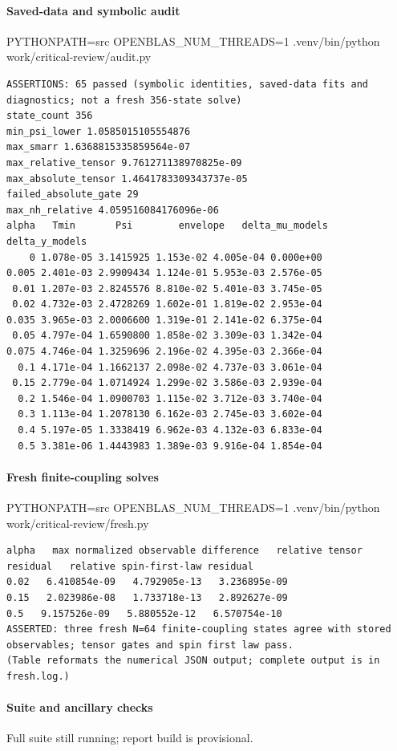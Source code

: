 \documentclass[10pt,a4paper]{article}
\begin{document}
\paragraph{Saved-data and symbolic audit} PYTHONPATH=src OPENBLAS\_NUM\_THREADS=1 .venv/bin/python work/critical-review/audit.py
\begin{Verbatim}[fontsize=\scriptsize]
ASSERTIONS: 65 passed (symbolic identities, saved-data fits and diagnostics; not a fresh 356-state solve)
state_count 356
min_psi_lower 1.0585015105554876
max_smarr 1.6368815335859564e-07
max_relative_tensor 9.761271138970825e-09
max_absolute_tensor 1.4641783309343737e-05
failed_absolute_gate 29
max_nh_relative 4.059516084176096e-06
alpha   Tmin       Psi        envelope   delta_mu_models delta_y_models
    0 1.078e-05 3.1415925 1.153e-02 4.005e-04 0.000e+00
0.005 2.401e-03 2.9909434 1.124e-01 5.953e-03 2.576e-05
 0.01 1.207e-03 2.8245576 8.810e-02 5.401e-03 3.745e-05
 0.02 4.732e-03 2.4728269 1.602e-01 1.819e-02 2.953e-04
0.035 3.965e-03 2.0006600 1.319e-01 2.141e-02 6.375e-04
 0.05 4.797e-04 1.6590800 1.858e-02 3.309e-03 1.342e-04
0.075 4.746e-04 1.3259696 2.196e-02 4.395e-03 2.366e-04
  0.1 4.171e-04 1.1662137 2.098e-02 4.737e-03 3.061e-04
 0.15 2.779e-04 1.0714924 1.299e-02 3.586e-03 2.939e-04
  0.2 1.546e-04 1.0900703 1.115e-02 3.712e-03 3.740e-04
  0.3 1.113e-04 1.2078130 6.162e-03 2.745e-03 3.602e-04
  0.4 5.197e-05 1.3338419 6.962e-03 4.132e-03 6.833e-04
  0.5 3.381e-06 1.4443983 1.389e-03 9.916e-04 1.854e-04

\end{Verbatim}
\paragraph{Fresh finite-coupling solves} PYTHONPATH=src OPENBLAS\_NUM\_THREADS=1 .venv/bin/python work/critical-review/fresh.py
\begin{Verbatim}[fontsize=\scriptsize]
alpha   max normalized observable difference   relative tensor residual   relative spin-first-law residual
0.02   6.410854e-09   4.792905e-13   3.236895e-09
0.15   2.023986e-08   1.733718e-13   2.892627e-09
0.5   9.157526e-09   5.880552e-12   6.570754e-10
ASSERTED: three fresh N=64 finite-coupling states agree with stored observables; tensor gates and spin first law pass.
(Table reformats the numerical JSON output; complete output is in fresh.log.)
\end{Verbatim}
\paragraph{Suite and ancillary checks} Full suite still running; report build is provisional.
\end{document}
